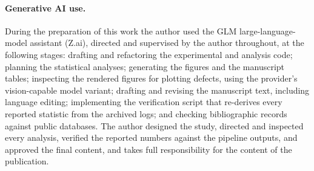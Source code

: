 \documentclass[10pt]{article}
\begin{document}
\paragraph{Generative AI use.} During the preparation of this work the author used the GLM large-language-model assistant (Z.ai), directed and supervised by the author throughout, at the following stages: drafting and refactoring the experimental and analysis code; planning the statistical analyses; generating the figures and the manuscript tables; inspecting the rendered figures for plotting defects, using the provider's vision-capable model variant; drafting and revising the manuscript text, including language editing; implementing the verification script that re-derives every reported statistic from the archived logs; and checking bibliographic records against public databases. The author designed the study, directed and inspected every analysis, verified the reported numbers against the pipeline outputs, and approved the final content, and takes full responsibility for the content of the publication.
\end{document}
